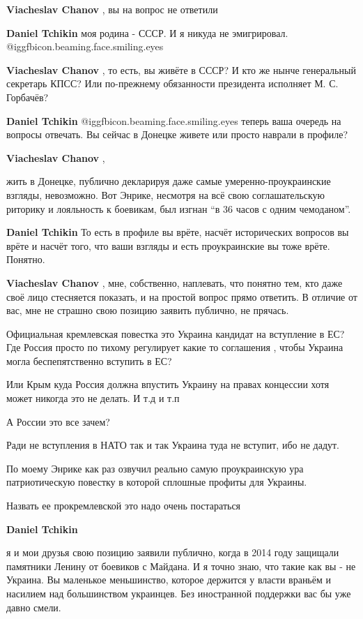 \begin{itemize}
\begin{itemize}
\textbf{Viacheslav Chanov} , вы на вопрос не ответили

\textbf{Daniel Tchikin} моя родина - СССР. И я никуда не эмигрировал.  @igg{fbicon.beaming.face.smiling.eyes} 

\textbf{Viacheslav Chanov} , то есть, вы живёте в СССР? И кто же нынче генеральный секретарь КПСС? Или по-прежнему обязанности президента исполняет М. С. Горбачёв?

\textbf{Daniel Tchikin}  @igg{fbicon.beaming.face.smiling.eyes} теперь ваша очередь на вопросы отвечать.
Вы сейчас в Донецке живете или просто наврали в профиле?

\textbf{Viacheslav Chanov} , 

жить в Донецке, публично декларируя даже самые умеренно-проукраинские взгляды,
невозможно. Вот Энрике, несмотря на всё свою соглашательскую риторику и
лояльность к боевикам, был изгнан \enquote{в 36 часов с одним чемоданом}.


\textbf{Daniel Tchikin} То есть в профиле вы врёте, насчёт исторических вопросов вы врёте и насчёт того, что ваши взгляды и есть проукраинские вы тоже врёте.
Понятно.

\textbf{Viacheslav Chanov} , мне, собственно, наплевать, что понятно тем, кто даже своё лицо стесняется показать, и на простой вопрос прямо ответить. В отличие от вас, мне не страшно свою позицию заявить публично, не прячась.


Официальная кремлевская повестка это Украина кандидат на вступление в ЕС? Где
Россия просто по тихому регулирует какие то соглашения , чтобы Украина могла
беспепятственно вступить в ЕС?

Или Крым куда Россия должна впустить Украину на правах концессии хотя может
никогда это не делать. И т.д и т.п

А России это все зачем?

Ради не вступления в НАТО так и так Украина туда не вступит, ибо не дадут.

По моему Энрике как раз озвучил реально самую проукраинскую ура патриотическую
повестку в которой сплошные профиты для Украины.

Назвать ее прокремлевской это надо очень постараться


\textbf{Daniel Tchikin} 

я и мои друзья свою позицию заявили публично, когда в 2014 году защищали
памятники Ленину от боевиков с Майдана. И я точно знаю, что такие как вы - не
Украина. Вы маленькое меньшинство, которое держится у власти враньём и насилием
над большинством украинцев. Без иностранной поддержки вас бы уже давно смели.



\end{itemize}
\end{itemize}
